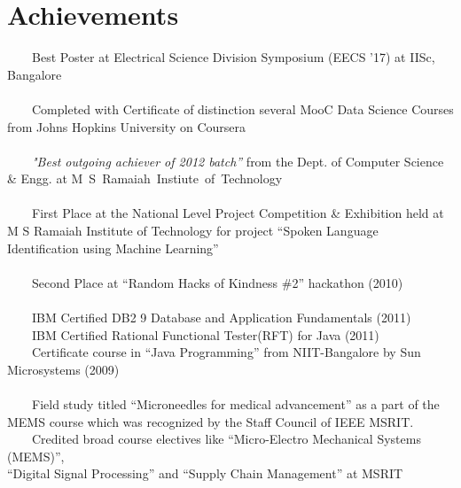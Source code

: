 \documentclass[a4paper,10pt]{article} %
\newcommand{\tabitem}{~~\llap{\textbullet}~~}
\begin{document}
\section{Achievements}
\tabitem Best Poster at Electrical Science Division Symposium (EECS '17) at IISc, Bangalore \\
\\
\tabitem Completed with Certificate of distinction several MooC Data Science Courses from Johns Hopkins University on Coursera\\
\\
\tabitem \textit{"Best outgoing achiever of 2012 batch”} from the Dept. of Computer Science \& Engg. at \mbox{M S Ramaiah Instiute of Technology} \\
\\
\tabitem First Place at the National Level Project Competition \& Exhibition held at M S Ramaiah Institute of Technology for project “Spoken Language Identification using Machine Learning”\\
\\
\tabitem Second Place at “Random Hacks of Kindness \#2” hackathon (2010)\\
\\
\tabitem IBM Certified DB2 9 Database and Application Fundamentals (2011)\\
\tabitem IBM Certified Rational Functional Tester(RFT) for Java (2011)\\
\tabitem Certificate course in “Java Programming” from NIIT-Bangalore by Sun Microsystems (2009)\\
\\
\tabitem Field study titled “Microneedles for medical advancement” as a part of the MEMS course which was recognized by the Staff Council of IEEE MSRIT.\\
\tabitem Credited broad course electives like “Micro-Electro Mechanical Systems (MEMS)”, \\“Digital Signal Processing” and “Supply Chain Management” at MSRIT \\
\\

\end{document}
